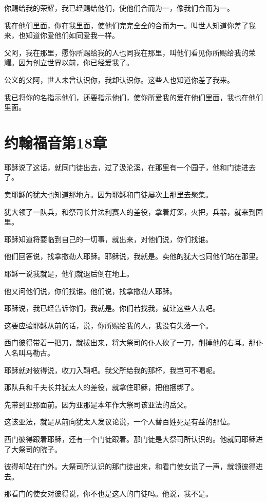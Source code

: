 \documentclass[12pt,oneside]{book}
\begin{document}
你赐给我的荣耀，我已经赐给他们，使他们合而为一，像我们合而为一。

我在他们里面，你在我里面，使他们完完全全的合而为一。叫世人知道你差了我来，也知道你爱他们如同爱我一样。

父阿，我在那里，愿你所赐给我的人也同我在那里，叫他们看见你所赐给我的荣耀。因为创立世界以前，你已经爱我了。

公义的父阿，世人未曾认识你，我却认识你。这些人也知道你差了我来。

我已将你的名指示他们，还要指示他们，使你所爱我的爱在他们里面，我也在他们里面。

\chapter{约翰福音第18章}
耶稣说了这话，就同门徒出去，过了汲沦溪，在那里有一个园子，他和门徒进去了。

卖耶稣的犹大也知道那地方。因为耶稣和门徒屡次上那里去聚集。

犹大领了一队兵，和祭司长并法利赛人的差役，拿着灯笼，火把，兵器，就来到园里。

耶稣知道将要临到自己的一切事，就出来，对他们说，你们找谁。

他们回答说，找拿撒勒人耶稣。耶稣说，我就是。卖他的犹大也同他们站在那里。

耶稣一说我就是，他们就退后倒在地上。

他又问他们说，你们找谁。他们说，找拿撒勒人耶稣。

耶稣说，我已经告诉你们，我就是。你们若找我，就让这些人去吧。

这要应验耶稣从前的话，说，你所赐给我的人，我没有失落一个。

西门彼得带着一把刀，就拔出来，将大祭司的仆人砍了一刀，削掉他的右耳。那仆人名叫马勒古。

耶稣就对彼得说，收刀入鞘吧。我父所给我的那杯，我岂可不喝呢。

那队兵和千夫长并犹太人的差役，就拿住耶稣，把他捆绑了。

先带到亚那面前。因为亚那是本年作大祭司该亚法的岳父。

这该亚法，就是从前向犹太人发议论说，一个人替百姓死是有益的那位。

西门彼得跟着耶稣，还有一个门徒跟着。那门徒是大祭司所认识的。他就同耶稣进了大祭司的院子。

彼得却站在门外。大祭司所认识的那门徒出来，和看门使女说了一声，就领彼得进去。

那看门的使女对彼得说，你不也是这人的门徒吗。他说，我不是。
\end{document}
